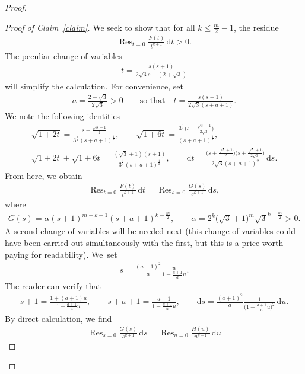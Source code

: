 \documentclass[10pt,a4paper]{amsart}
\numberwithin{equation}{section}
\begin{document}
\begin{proof}
\begin{proof}[Proof of Claim~\ref{claim}]
We seek to show that for all $k\leq \frac{m}{2}-1$, the residue
\begin{gather*}
\operatorname{Res}_{t=0} \frac{F(t)}{t^{k+1}} \,{\mathrm dt}>0.
\end{gather*}
The peculiar change of variables
\begin{gather*}
t=\frac{s(s+1)}{2\sqrt{3}s+(2+\sqrt{3})}
\end{gather*}
will simplify the calculation.
For convenience, set
\begin{gather*}
a=\frac{2-\sqrt{3}}{2\sqrt{3}}>0\qquad\text{so that}\quad t=\frac{s(s+1)}{2\sqrt{3}(s+a+1)}.
\end{gather*}
We note the following identities
\begin{gather*}
\sqrt{1+2t}=\frac{s+\frac{\sqrt{3}+1}{2}}{3^{\frac{1}{4}} (s+a+1)^{\frac{1}{2}}}, \qquad \sqrt{1+6t}=\frac{3^{\frac{1}{4}}\big(s+\frac{\sqrt{3}+1}{2\sqrt{3}}\big)}{(s+a+1)^{\frac{1}{2}}},
\\
\sqrt{1+2t}+\sqrt{1+6t}=\frac{(\sqrt{3}+1)(s+1)}{3^{\frac{1}{4}}(s+a+1)^{\frac{1}{2}}},\qquad
{\mathrm dt}=\frac{\big(s+\frac{\sqrt{3}+1}{2}\big)\big(s+\frac{\sqrt{3}+1}{2\sqrt{3}}\big)}{2\sqrt{3} (s+a+1)^2}\,{\mathrm ds}.
\end{gather*}
From here, we obtain
\begin{gather*}
\operatorname{Res}_{t=0} \frac{F(t)}{t^{k+1}} \,{\mathrm dt}=\operatorname{Res}_{s=0} \frac{G(s)}{s^{k+1}} \,{\mathrm ds},
\end{gather*}
where
\begin{gather*}
G(s)=\alpha (s+1)^{m-k-1} (s+a+1)^{k-\frac{m}{2}}, \qquad
\alpha=2^k \big(\sqrt{3}+1\big)^{m} \sqrt{3}^{k-\frac{m}{2}}>0.
\end{gather*}
A second change of variables will be needed next (this change of variables could have been carried out simultaneously with the first, but this is a price worth paying for readability). We~set
\begin{gather*}
s=\frac{(a+1)^2}{a} \frac{u}{1-\frac{a+1}{a}u}.
\end{gather*}
The reader can verify that
\begin{gather*}
s+1=\frac{1+(a+1)u}{1-\frac{a+1}{a}u}, \qquad s+a+1=\frac{a+1}{1-\frac{a+1}{a}u}, \qquad
{\mathrm ds}=\frac{(a+1)^2}{a} \frac{1}{\big(1-\frac{a+1}{a}u\big)^2}\,{\mathrm du}.
\end{gather*}
By direct calculation, we find
\begin{gather*}
\operatorname{Res}_{s=0} \frac{G(s)}{s^{k+1}}\,{\mathrm ds}=\operatorname{Res}_{u=0} \frac{H(u)}{u^{k+1}}\,{\mathrm du}

\end{gather*}
\end{proof}
\end{proof}
\end{document}

